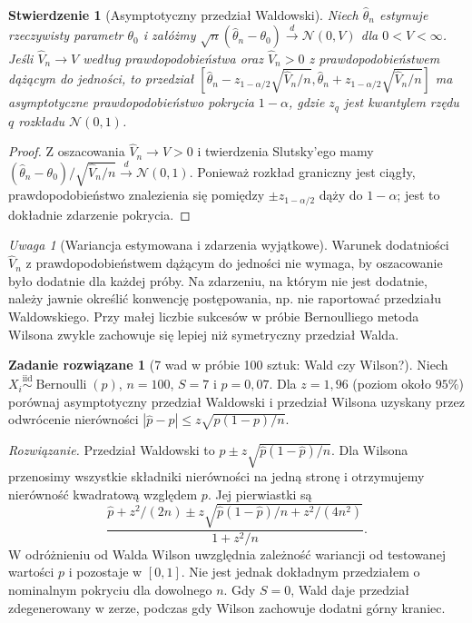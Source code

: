 \documentclass[11pt,a4paper,oneside]{report}
\numberwithin{equation}{chapter}
\theoremstyle{plain}
\newtheorem{stwierdzenie}[twierdzenie]{Stwierdzenie}
\theoremstyle{definition}
\newtheorem{zadanie}{Zadanie rozwiązane}[chapter]
\theoremstyle{remark}
\newtheorem{uwaga}{Uwaga}[chapter]
\newcommand{\Normal}{\mathcal N}
\newcommand{\iid}{\mathrel{\overset{\mathrm{iid}}\sim}}
\begin{document}
\begin{stwierdzenie}[Asymptotyczny przedział Waldowski]
\label{prop:wald-ci}
Niech $\widehat\theta_n$ estymuje rzeczywisty parametr
$\theta_0$ i załóżmy
$\sqrt n(\widehat\theta_n-\theta_0)\xrightarrow{d}
\Normal(0,V)$ dla $0<V<\infty$.
Jeśli $\widehat V_n\to V$ według prawdopodobieństwa
oraz $\widehat V_n>0$ z prawdopodobieństwem dążącym do
jedności, to przedział
$[\widehat\theta_n-z_{1-\alpha/2}\sqrt{\widehat V_n/n},
\widehat\theta_n+z_{1-\alpha/2}\sqrt{\widehat V_n/n}]$
ma asymptotyczne prawdopodobieństwo pokrycia $1-\alpha$,
gdzie $z_q$ jest kwantylem rzędu $q$ rozkładu $\Normal(0,1)$.
\end{stwierdzenie}
\begin{proof}
Z oszacowania $\widehat V_n\to V>0$ i twierdzenia Slutsky'ego
mamy $(\widehat\theta_n-\theta_0)/\sqrt{\widehat V_n/n}
\xrightarrow{d}\Normal(0,1)$. Ponieważ rozkład graniczny
jest ciągły, prawdopodobieństwo znalezienia się pomiędzy
$\pm z_{1-\alpha/2}$ dąży do $1-\alpha$; jest to dokładnie
zdarzenie pokrycia.
\end{proof}

\begin{uwaga}[Wariancja estymowana i zdarzenia wyjątkowe]
Warunek dodatniości $\widehat V_n$ z prawdopodobieństwem
dążącym do jedności nie wymaga, by oszacowanie było dodatnie
dla każdej próby. Na zdarzeniu, na którym nie jest dodatnie,
należy jawnie określić konwencję postępowania, np. nie
raportować przedziału Waldowskiego. Przy małej liczbie sukcesów
w próbie Bernoulliego metoda Wilsona zwykle zachowuje się
lepiej niż symetryczny przedział Walda.
\end{uwaga}

\begin{zadanie}[7 wad w próbie 100 sztuk: Wald czy Wilson?]
\label{zad:wilson-100}
Niech $X_i\iid\operatorname{Bernoulli}(p)$, $n=100$,
$S=7$ i $\widehat p=0{,}07$. Dla $z=1{,}96$ (poziom około
$95\%$) porównaj asymptotyczny przedział Waldowski i
przedział Wilsona uzyskany przez odwrócenie nierówności
$|\widehat p-p|\le z\sqrt{p(1-p)/n}$.
\par\emph{Rozwiązanie.} Przedział Waldowski to
$\widehat p\pm z\sqrt{\widehat p(1-\widehat p)/n}$.
Dla Wilsona przenosimy wszystkie składniki nierówności na
jedną stronę i otrzymujemy nierówność kwadratową względem $p$.
Jej pierwiastki są
\[
\frac{\widehat p+z^2/(2n)\pm
z\sqrt{\widehat p(1-\widehat p)/n+z^2/(4n^2)}}{1+z^2/n}.
\]
W odróżnieniu od Walda Wilson uwzględnia zależność wariancji
od testowanej wartości $p$ i pozostaje w $[0,1]$.
Nie jest jednak dokładnym przedziałem o nominalnym pokryciu
dla dowolnego $n$. Gdy $S=0$, Wald daje przedział zdegenerowany
w zerze, podczas gdy Wilson zachowuje dodatni górny kraniec.
\end{zadanie}
\end{document}
